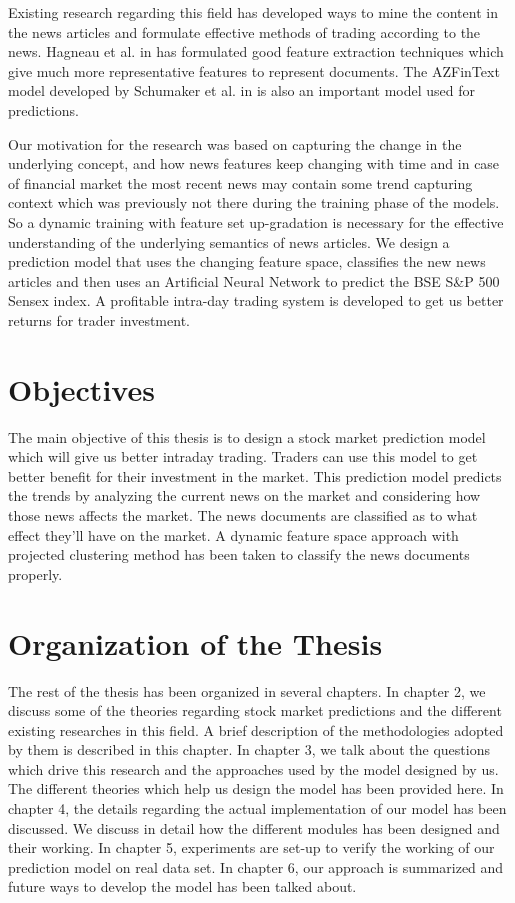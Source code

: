 \documentclass[a4paper,12bp]{report}
\begin{document}
Existing research regarding this field has developed ways to mine the content in the news articles and formulate effective methods of trading according to the news. Hagneau et al. in \cite{Hagenau:2013} has formulated good feature extraction techniques which give much more representative features to represent documents. The AZFinText model developed by Schumaker et al. in \cite{Schumaker:2009} is also an important model used for predictions.

Our motivation for the research was based on capturing the change in the underlying concept, and how news features keep changing with time and in case of financial market the most recent news may contain some trend capturing context which was previously not there during the training phase of the models. So a dynamic training with feature set up-gradation is necessary for the effective understanding of the underlying semantics of news articles. We design a prediction model that uses the changing feature space, classifies the new news articles and then uses an Artificial Neural Network to predict the BSE S\&P 500 Sensex index. A profitable intra-day trading system is developed to get us better returns for trader investment. 

\section{Objectives}
The main objective of this thesis is to design a stock market prediction model which will give us better intraday trading. Traders can use this model to get better benefit for their investment in the market. This prediction model predicts the trends by analyzing the current news on the market and considering how those news affects the market. The news documents are classified as to what effect they'll have on the market. A dynamic feature space approach with projected clustering method has been taken to classify the news documents properly. 

\section{Organization of the Thesis}

The rest of the thesis has been organized in several chapters. In chapter 2, we discuss some of the theories regarding stock market predictions and the different existing researches in this field. A brief description of the methodologies adopted by them is described in this chapter. In chapter 3, we talk about the questions which drive this research and the approaches used by the model designed by us. The different theories which help us design the model has been provided here. In chapter 4, the details regarding the actual implementation of our model has been discussed. We discuss in detail how the different  modules has been designed and their working. In chapter 5, experiments are set-up to verify the working of our prediction model on real data set. In chapter 6, our approach is summarized and future ways to develop the model has been talked about. 
\end{document}
